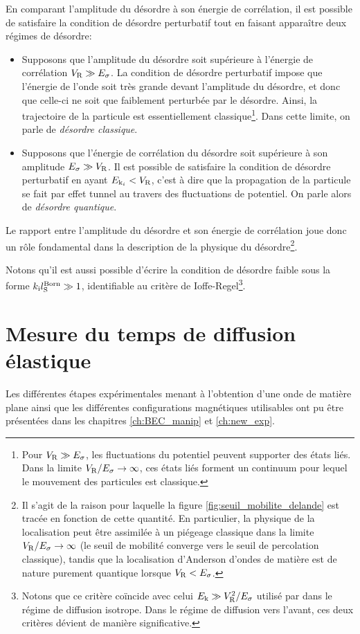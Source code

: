 En comparant l'amplitude du désordre à son énergie de corrélation, il est possible de satisfaire la condition de désordre perturbatif tout en faisant apparaître deux régimes de désordre:
\begin{itemize}
\item[\textendash] Supposons que l'amplitude du désordre soit supérieure à l'énergie de corrélation $V_{\mathrm{R}}\gg E_{\sigma}$. La condition de désordre perturbatif impose que l'énergie de l'onde soit très grande devant l'amplitude du désordre, et donc que celle-ci ne soit que faiblement perturbée par le désordre. Ainsi, la trajectoire de la particule est essentiellement classique\footnote{Pour $V_{\mathrm{R}}\gg E_{\sigma}$, les fluctuations du potentiel peuvent supporter des états liés. Dans la limite $V_{\mathrm{R}}/E_{\sigma}\rightarrow\infty$, ces états liés forment un continuum pour lequel le mouvement des particules est classique.}. Dans cette limite, on parle de \emph{désordre classique}.
\item[\textendash] Supposons que l'énergie de corrélation du désordre soit supérieure à son amplitude $E_{\sigma}\gg V_{\mathrm{R}}$. Il est possible de satisfaire la condition de désordre perturbatif en ayant $E_{\mathrm{k}_i}<V_{\mathrm{R}}$, c'est à dire que la propagation de la particule se fait par effet tunnel au travers des fluctuations de potentiel. On parle alors de \emph{désordre quantique}.
\end{itemize}
Le rapport entre l'amplitude du désordre et son énergie de corrélation joue donc un rôle fondamental dans la description de la physique du désordre\footnote{Il s'agit de la raison pour laquelle la figure \ref{fig:seuil_mobilite_delande} est tracée en fonction de cette quantité. En particulier, la physique de la localisation peut être assimilée à un piégeage classique dans la limite $V_{\mathrm{R}}/E_{\sigma}\rightarrow\infty$ (le seuil de mobilité converge vers le seuil de percolation classique), tandis que la localisation d'Anderson d'ondes de matière est de nature purement quantique lorsque $V_{\mathrm{R}}<E_{\sigma}$.}. 

Notons qu'il est aussi possible d'écrire la condition de désordre faible sous la forme $k_{\mathrm{i}}l_{\mathrm{S}}^{\mathrm{Born}}\gg 1$, identifiable au critère de Ioffe-Regel\footnote{Notons que ce critère coïncide avec celui $E_{\mathrm{k}}\gg V_{\mathrm{R}}^2/E_{\sigma}$ utilisé par \citep{kuhn2007coherent} dans le régime de diffusion isotrope. Dans le régime de diffusion vers l'avant, ces deux critères dévient de manière significative.}. 




\section{Mesure du temps de diffusion élastique}
Les différentes étapes expérimentales menant à l'obtention d'une onde de matière plane ainsi que les différentes configurations magnétiques utilisables ont pu être présentées dans les chapitres \ref{ch:BEC_manip} et \ref{ch:new_exp}. 

